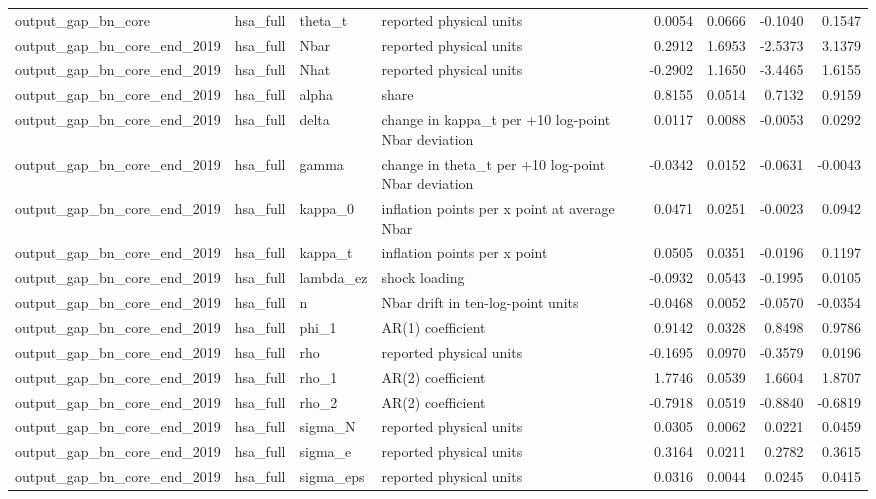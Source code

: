 \begin{tabular}{llllrrrr}
output\_gap\_bn\_core & hsa\_full & theta\_t & reported physical units & 0.0054 & 0.0666 & -0.1040 & 0.1547 \\
output\_gap\_bn\_core\_end\_2019 & hsa\_full & Nbar & reported physical units & 0.2912 & 1.6953 & -2.5373 & 3.1379 \\
output\_gap\_bn\_core\_end\_2019 & hsa\_full & Nhat & reported physical units & -0.2902 & 1.1650 & -3.4465 & 1.6155 \\
output\_gap\_bn\_core\_end\_2019 & hsa\_full & alpha & share & 0.8155 & 0.0514 & 0.7132 & 0.9159 \\
output\_gap\_bn\_core\_end\_2019 & hsa\_full & delta & change in kappa\_t per +10 log-point Nbar deviation & 0.0117 & 0.0088 & -0.0053 & 0.0292 \\
output\_gap\_bn\_core\_end\_2019 & hsa\_full & gamma & change in theta\_t per +10 log-point Nbar deviation & -0.0342 & 0.0152 & -0.0631 & -0.0043 \\
output\_gap\_bn\_core\_end\_2019 & hsa\_full & kappa\_0 & inflation points per x point at average Nbar & 0.0471 & 0.0251 & -0.0023 & 0.0942 \\
output\_gap\_bn\_core\_end\_2019 & hsa\_full & kappa\_t & inflation points per x point & 0.0505 & 0.0351 & -0.0196 & 0.1197 \\
output\_gap\_bn\_core\_end\_2019 & hsa\_full & lambda\_ez & shock loading & -0.0932 & 0.0543 & -0.1995 & 0.0105 \\
output\_gap\_bn\_core\_end\_2019 & hsa\_full & n & Nbar drift in ten-log-point units & -0.0468 & 0.0052 & -0.0570 & -0.0354 \\
output\_gap\_bn\_core\_end\_2019 & hsa\_full & phi\_1 & AR(1) coefficient & 0.9142 & 0.0328 & 0.8498 & 0.9786 \\
output\_gap\_bn\_core\_end\_2019 & hsa\_full & rho & reported physical units & -0.1695 & 0.0970 & -0.3579 & 0.0196 \\
output\_gap\_bn\_core\_end\_2019 & hsa\_full & rho\_1 & AR(2) coefficient & 1.7746 & 0.0539 & 1.6604 & 1.8707 \\
output\_gap\_bn\_core\_end\_2019 & hsa\_full & rho\_2 & AR(2) coefficient & -0.7918 & 0.0519 & -0.8840 & -0.6819 \\
output\_gap\_bn\_core\_end\_2019 & hsa\_full & sigma\_N & reported physical units & 0.0305 & 0.0062 & 0.0221 & 0.0459 \\
output\_gap\_bn\_core\_end\_2019 & hsa\_full & sigma\_e & reported physical units & 0.3164 & 0.0211 & 0.2782 & 0.3615 \\
output\_gap\_bn\_core\_end\_2019 & hsa\_full & sigma\_eps & reported physical units & 0.0316 & 0.0044 & 0.0245 & 0.0415 \\

\end{tabular}
